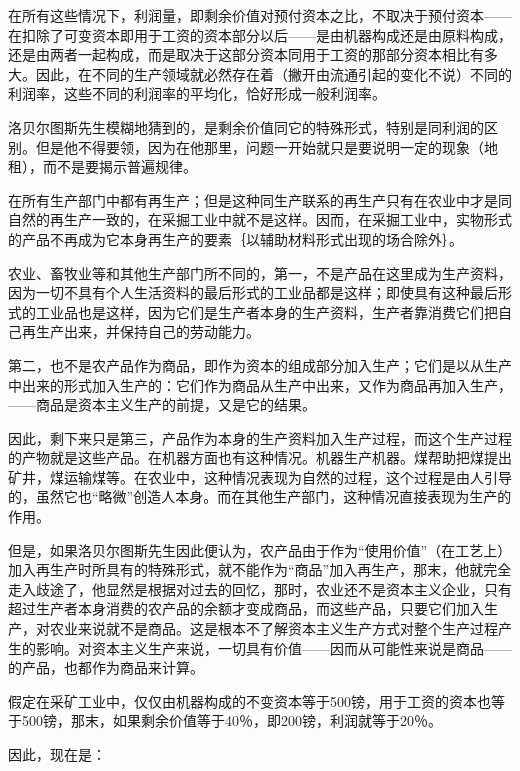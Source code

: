 在所有这些情况下，利润量，即剩余价值对预付资本之比，不取决于预付资本——在扣除了可变资本即用于工资的资本部分以后——是由机器构成还是由原料构成，还是由两者一起构成，而是取决于这部分资本同用于工资的那部分资本相比有多大。因此，在不同的生产领域就必然存在着（撇开由流通引起的变化不说）不同的利润率，这些不同的利润率的平均化，恰好形成一般利润率。

洛贝尔图斯先生模糊地猜到的，是剩余价值同它的特殊形式，特别是同利润的区别。但是他不得要领，因为在他那里，问题一开始就只是要说明一定的现象（地租），而不是要揭示普遍规律。

在所有生产部门中都有再生产；但是这种同生产联系的再生产只有在农业中才是同自然的再生产一致的，在采掘工业中就不是这样。因而，在采掘工业中，实物形式的产品不再成为它本身再生产的要素｛以辅助材料形式出现的场合除外｝。

农业、畜牧业等和其他生产部门所不同的，第一，不是产品在这里成为生产资料，因为一切不具有个人生活资料的最后形式的工业品都是这样；即使具有这种最后形式的工业品也是这样，因为它们是生产者本身的生产资料，生产者靠消费它们把自己再生产出来，并保持自己的劳动能力。

第二，也不是农产品作为商品，即作为资本的组成部分加入生产；它们是以从生产中出来的形式加入生产的：它们作为商品从生产中出来，又作为商品再加入生产，——商品是资本主义生产的前提，又是它的结果。

因此，剩下来只是第三，产品作为本身的生产资料加入生产过程，而这个生产过程的产物就是这些产品。在机器方面也有这种情况。机器生产机器。煤帮助把煤提出矿井，煤运输煤等。在农业中，这种情况表现为自然的过程，这个过程是由人引导的，虽然它也“略微”创造人本身。而在其他生产部门，这种情况直接表现为生产的作用。

但是，如果洛贝尔图斯先生因此便认为，农产品由于作为“使用价值”（在工艺上）加入再生产时所具有的特殊形式，就不能作为“商品”加入再生产，那末，他就完全走入歧途了，他显然是根据对过去的回忆，那时，农业还不是资本主义企业，只有超过生产者本身消费的农产品的余额才变成商品，而这些产品，只要它们加入生产，对农业来说就不是商品。这是根本不了解资本主义生产方式对整个生产过程产生的影响。对资本主义生产来说，一切具有价值——因而从可能性来说是商品——的产品，也都作为商品来计算。


假定在采矿工业中，仅仅由机器构成的不变资本等于500镑，用于工资的资本也等于500镑，那末，如果剩余价值等于40％，即200镑，利润就等于20％。

因此，现在是：

\todo{}

